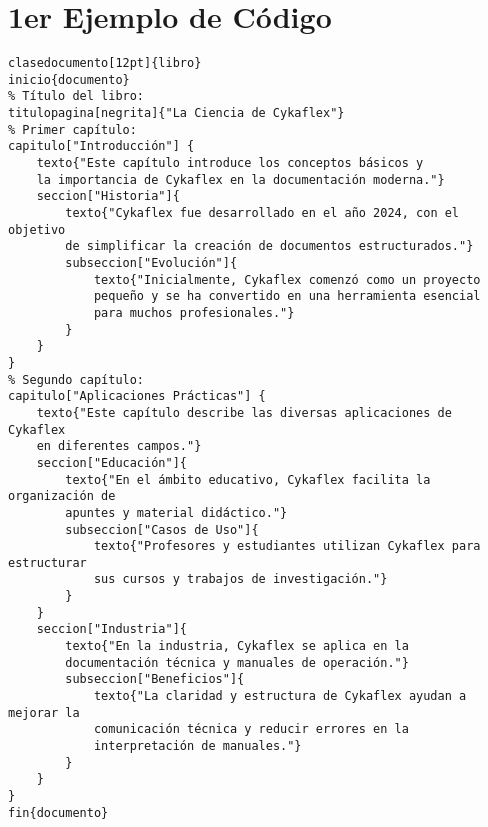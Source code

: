 \documentclass[12pt]{article}
\begin{document}
\section{1er Ejemplo de Código}
        \begin{center}
        \begin{verbatim}
clasedocumento[12pt]{libro}
inicio{documento}
% Título del libro:
titulopagina[negrita]{"La Ciencia de Cykaflex"}
% Primer capítulo:
capitulo["Introducción"] {
    texto{"Este capítulo introduce los conceptos básicos y 
    la importancia de Cykaflex en la documentación moderna."}
    seccion["Historia"]{
        texto{"Cykaflex fue desarrollado en el año 2024, con el objetivo 
        de simplificar la creación de documentos estructurados."}
        subseccion["Evolución"]{
            texto{"Inicialmente, Cykaflex comenzó como un proyecto 
            pequeño y se ha convertido en una herramienta esencial 
            para muchos profesionales."}
        }
    }
}
% Segundo capítulo:
capitulo["Aplicaciones Prácticas"] {
    texto{"Este capítulo describe las diversas aplicaciones de Cykaflex 
    en diferentes campos."}
    seccion["Educación"]{
        texto{"En el ámbito educativo, Cykaflex facilita la organización de 
        apuntes y material didáctico."}
        subseccion["Casos de Uso"]{
            texto{"Profesores y estudiantes utilizan Cykaflex para estructurar 
            sus cursos y trabajos de investigación."}
        }
    }
    seccion["Industria"]{
        texto{"En la industria, Cykaflex se aplica en la 
        documentación técnica y manuales de operación."}
        subseccion["Beneficios"]{
            texto{"La claridad y estructura de Cykaflex ayudan a mejorar la 
            comunicación técnica y reducir errores en la 
            interpretación de manuales."}
        }
    }
}
fin{documento}
        \end{verbatim}
        \end{center}
\newpage
\end{document}
